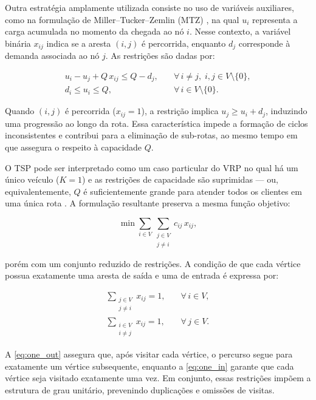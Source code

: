 Outra estratégia amplamente utilizada consiste no uso de variáveis auxiliares, como na formulação de Miller--Tucker--Zemlin (MTZ) \cite{miller1960integer}, na qual $u_i$ representa a carga acumulada no momento da chegada ao nó $i$. Nesse contexto, a variável binária $x_{ij}$ indica se a aresta $(i,j)$ é percorrida, enquanto $d_j$ corresponde à demanda associada ao nó $j$. As restrições são dadas por:

\begin{eqnarray}
u_i - u_j + Q\, x_{ij} \leq Q - d_j, & \quad \forall\, i \neq j,\; i,j \in V \setminus \{0\}, \\[4pt]
d_i \leq u_i \leq Q, & \quad \forall\, i \in V \setminus \{0\}.
\end{eqnarray}

Quando $(i,j)$ é percorrida ($x_{ij}=1$), a restrição implica $u_j \geq u_i + d_j$, induzindo uma progressão ao longo da rota. Essa característica impede a formação de ciclos inconsistentes e contribui para a eliminação de sub-rotas, ao mesmo tempo em que assegura o respeito à capacidade $Q$.

O TSP pode ser interpretado como um caso particular do VRP no qual há um único veículo ($K = 1$) \cite{toth2002vehicle} e as restrições de capacidade são suprimidas — ou, equivalentemente, $Q$ é suficientemente grande para atender todos os clientes em uma única rota \cite{balinski1964integer, eilon1974distribution}. A formulação resultante preserva a mesma função objetivo:

\begin{equation}
    \min \sum_{i \in V} \sum_{\substack{j \in V \\ j \neq i}} c_{ij}\, x_{ij},
\end{equation}

\noindent porém com um conjunto reduzido de restrições. A condição de que cada vértice possua exatamente uma aresta de saída e uma de entrada é expressa por:

\begin{eqnarray}
\sum_{\substack{j \in V \\ j \neq i}} x_{ij} = 1, & \quad \forall\, i \in V, \label{eq:one_out} \\[4pt]
\sum_{\substack{i \in V \\ i \neq j}} x_{ij} = 1, & \quad \forall\, j \in V. \label{eq:one_in}
\end{eqnarray}

{\red A \autoref{eq:one_out} assegura que, após visitar cada vértice, o percurso segue para exatamente um vértice subsequente, enquanto a \autoref{eq:one_in} garante que cada vértice seja visitado exatamente uma vez. Em conjunto, essas restrições impõem a estrutura de grau unitário, prevenindo duplicações e omissões de visitas.}

